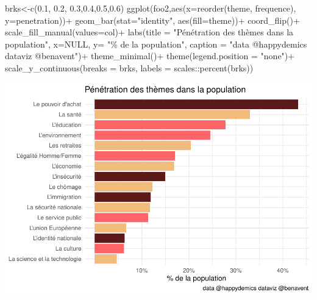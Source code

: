 \documentclass[
]{book}
\newenvironment{Shaded}{\begin{snugshade}}{\end{snugshade}}
\newcommand{\AttributeTok}[1]{\textcolor[rgb]{0.77,0.63,0.00}{#1}}
\newcommand{\ConstantTok}[1]{\textcolor[rgb]{0.00,0.00,0.00}{#1}}
\newcommand{\FloatTok}[1]{\textcolor[rgb]{0.00,0.00,0.81}{#1}}
\newcommand{\FunctionTok}[1]{\textcolor[rgb]{0.00,0.00,0.00}{#1}}
\newcommand{\NormalTok}[1]{#1}
\newcommand{\OtherTok}[1]{\textcolor[rgb]{0.56,0.35,0.01}{#1}}
\newcommand{\SpecialCharTok}[1]{\textcolor[rgb]{0.00,0.00,0.00}{#1}}
\newcommand{\StringTok}[1]{\textcolor[rgb]{0.31,0.60,0.02}{#1}}
\begin{document}
\begin{Shaded}
\begin{Highlighting}[]
\NormalTok{brks}\OtherTok{\textless{}{-}}\FunctionTok{c}\NormalTok{(}\FloatTok{0.1}\NormalTok{, }\FloatTok{0.2}\NormalTok{, }\FloatTok{0.3}\NormalTok{,}\FloatTok{0.4}\NormalTok{,}\FloatTok{0.5}\NormalTok{,}\FloatTok{0.6}\NormalTok{)}
\FunctionTok{ggplot}\NormalTok{(foo2,}\FunctionTok{aes}\NormalTok{(}\AttributeTok{x=}\FunctionTok{reorder}\NormalTok{(theme, frequence), }\AttributeTok{y=}\NormalTok{penetration))}\SpecialCharTok{+}
  \FunctionTok{geom\_bar}\NormalTok{(}\AttributeTok{stat=}\StringTok{"identity"}\NormalTok{, }\FunctionTok{aes}\NormalTok{(}\AttributeTok{fill=}\NormalTok{theme))}\SpecialCharTok{+}
  \FunctionTok{coord\_flip}\NormalTok{()}\SpecialCharTok{+}
  \FunctionTok{scale\_fill\_manual}\NormalTok{(}\AttributeTok{values=}\NormalTok{col)}\SpecialCharTok{+}
  \FunctionTok{labs}\NormalTok{(}\AttributeTok{title =} \StringTok{"Pénétration des thèmes dans la population"}\NormalTok{,}
       \AttributeTok{x=}\ConstantTok{NULL}\NormalTok{, }
       \AttributeTok{y=} \StringTok{"\% de la population"}\NormalTok{, }
       \AttributeTok{caption =} \StringTok{"data @happydemics dataviz @benavent"}\NormalTok{)}\SpecialCharTok{+}
  \FunctionTok{theme\_minimal}\NormalTok{()}\SpecialCharTok{+}
  \FunctionTok{theme}\NormalTok{(}\AttributeTok{legend.position =} \StringTok{"none"}\NormalTok{)}\SpecialCharTok{+} 
  \FunctionTok{scale\_y\_continuous}\NormalTok{(}\AttributeTok{breaks =}\NormalTok{ brks, }\AttributeTok{labels =}\NormalTok{ scales}\SpecialCharTok{::}\FunctionTok{percent}\NormalTok{(brks))}
\end{Highlighting}
\end{Shaded}

\includegraphics{bookdown-demo_files/figure-latex/0812-1.pdf}
\end{document}

